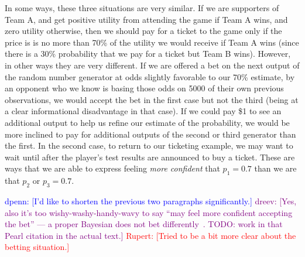 \documentclass[sigconf,anonymous]{aamas}   %
\newcommand{\rupert}[1]{\ifnum\Chatty=1 \textcolor{red}   {Rupert: [#1]} \fi}
\newcommand{\dpenn} [1]{\ifnum\Chatty=1 \textcolor{blue}  {dpenn:  [#1]} \fi}
\newcommand{\dreev} [1]{\ifnum\Chatty=1 \textcolor{purple}{dreev:  [#1]} \fi}
\begin{document}

In some ways, these three situations are very similar. 
If we are supporters of Team A, and get positive utility from attending the game if Team A wins, and zero utility otherwise, then we should pay for a ticket to the game only if the price is is no more than 70\% of the utility we would receive if Team A wins (since there is a 30\% probability that we pay for a ticket but Team B wins).
However, in other ways they are very different. If we are offered a bet on the next output of the random number generator at odds slightly favorable to our 70\% estimate, by an opponent who we know is basing those odds on 5000 of their own previous observations, we would accept the bet in the first case but not the third (being at a clear informational disadvantage in that case).
If we could pay \$1 to see an additional output to help us refine our estimate of the probability, we would be more inclined to pay for additional outputs of the second or third generator than the first. In the second case, to return to our ticketing example, we may want to wait until after the player's test results are announced to buy a ticket. These are ways that we are able to express feeling \emph{more confident} that $p_1=0.7$ than we are that $p_2$ or $p_3=0.7$.

\dpenn{I'd like to shorten the previous two paragraphs significantly.}
\dreev{Yes, also it's too wishy-washy-handy-wavy to say ``may feel more confident accepting the bet'' --- a proper Bayesian does not bet differently~\cite{pearl1987}.
TODO: work in that Pearl citation in the actual text.}
\rupert{Tried to be a bit more clear about the betting situation.}
\end{document}
